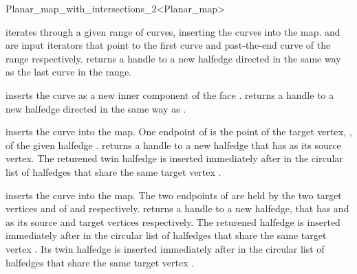 \begin{ccRefClass}{Planar_map_with_intersections_2<Planar_map>}
\begin{ccAdvanced}
  {iterates through a given range of curves, inserting the curves into
  the map.  and  are input iterators that point to
  the first curve and past-the-end curve of the range
  respectively.  returns a handle to a
  new halfedge directed in the same way as the last curve in the range.
  }

  {inserts the curve  as a new inner component of the face
  .  returns a
  handle to a new halfedge directed in the same way as .
  }

  {inserts the curve  into the map. One endpoint of 
  is the point of the target vertex, , of the given halfedge
  .  returns a handle
  to a new halfedge that has   as its source vertex. The
  returened twin halfedge is inserted immediately after  in the
  circular list of halfedges that share the same target vertex
  .
  }

  {inserts the curve  into the map. The two endpoints of
   are held by the two target vertices  and 
  of  and 
  respectively.  returns a
  handle to a new halfedge, that has  and  as its
  source and target vertices respectively. The returened halfedge is
  inserted immediately after  in the  circular list of
  halfedges that share the same target vertex . Its twin
  halfedge is inserted immediately after  in the circular list
  of halfedges that share the same target vertex .
  }


\end{ccAdvanced}
\end{ccRefClass}
